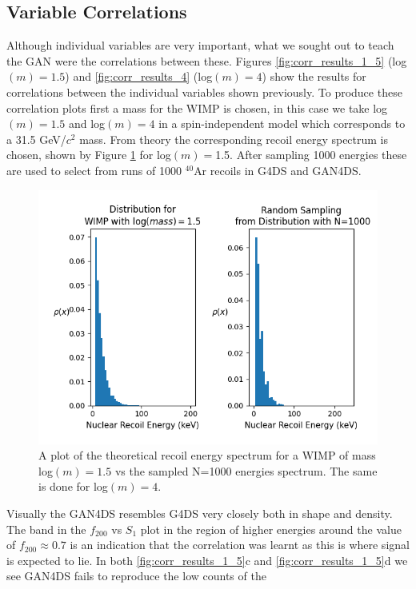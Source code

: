 \documentclass[11pt]{article} %
\begin{document}
\subsection{Variable Correlations}
Although individual variables are very important, what we sought out to teach the GAN were the correlations between these.
Figures \ref{fig:corr_results_1_5} (log$(m)=1.5$) and \ref{fig:corr_results_4} (log$(m)=4$) show the results for correlations between
the individual variables shown previously.
To produce these correlation plots first a mass for the WIMP is chosen, in this case we take log$(m)=1.5$ and log$(m)=4$ in a spin-independent model which corresponds to a 31.5 GeV/$c^2$ mass.
From theory the corresponding recoil energy spectrum is chosen, shown by Figure \ref{fig:recoil} for log$(m)=$1.5.
After sampling 1000 energies these are used to select from runs of 1000 $^{40}\mathrm{\text{Ar}}$ recoils in G4DS and GAN4DS.
\begin{figure}[H]
\centering
\includegraphics[scale=0.6]{images/Ar_c1dat_m1-5.png}
\caption{A plot of the theoretical recoil energy spectrum for a WIMP of mass log$(m)=1.5$ vs the
sampled N=1000 energies spectrum. The same is done for log$(m)=4$.}
\label{fig:recoil}
\end{figure}
Visually the GAN4DS resembles G4DS very closely both in shape and density.
The band in the $f_{200}$ vs $S_1$ plot in the region of higher energies around the value of $f_{200}\approx 0.7$ is an indication that the correlation was
learnt as this is where signal is expected to lie.
In both \ref{fig:corr_results_1_5}c and \ref{fig:corr_results_1_5}d we see GAN4DS fails to reproduce the low counts of the
\end{document}
